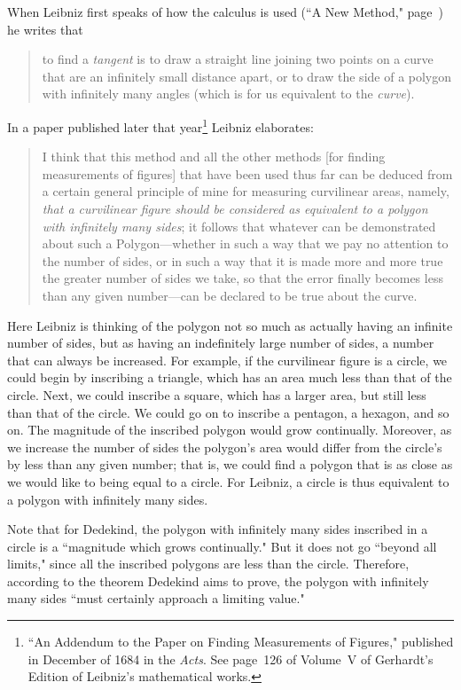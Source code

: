 \documentclass[polutonikogreek,english,twoside,openright]{article}
\begin{document}
When Leibniz first speaks of how the calculus is used (``A New
Method," page\ \pageref{taninfcl}) he writes that
\begin{quote}
  to find a {\em tangent} is to draw a straight line joining two
  points on a curve that are an infinitely small distance apart, or to
  draw the side of a polygon with infinitely many angles (which is for
  us equivalent to the {\em curve}).
\end{quote}
In a paper published later that year\footnote{``An Addendum to the
  Paper on Finding Measurements of Figures," published in December of
  1684 in the {\em Acts}.  See page~126 of Volume~V of Gerhardt's
  Edition of Leibniz's mathematical works.} Leibniz elaborates:
\begin{quote}
  I think that this method and all the other methods [for finding
  measurements of figures] that have been used thus far can be deduced
  from a certain general principle of mine for measuring curvilinear
  areas, namely, {\em that a curvilinear figure should be considered
    as equivalent to a polygon with infinitely many sides}; it follows
  that whatever can be demonstrated about such a Polygon---whether
  in such a way that we pay no attention to the number of sides, or in
  such a way that it is made more and more true the greater number of
  sides we take, so that the error finally becomes less than any given
  number---can be declared to be true about the curve.
\end{quote}
Here Leibniz is thinking of the polygon not so much as actually having
an infinite number of sides, but as having an indefinitely large
number of sides, a number that can always be increased.  For example,
if the curvilinear figure is a circle, we could begin by inscribing a
triangle, which has an area much less than that of the circle.  Next,
we could inscribe a square, which has a larger area, but still less
than that of the circle.  We could go on to inscribe a pentagon, a
hexagon, and so on.  The magnitude of the inscribed polygon would grow
continually.  Moreover, as we increase the number of sides the
polygon's area would differ from the circle's by less than any given
number; that is, we could find a polygon that is as close as we would
like to being equal to a circle.  For Leibniz, a circle is thus
equivalent to a polygon with infinitely many sides.

Note that for Dedekind, the polygon with infinitely many sides
inscribed in a circle is a ``magnitude which grows continually."  But
it does not go ``beyond all limits," since all the inscribed polygons
are less than the circle.  Therefore, according to the theorem
Dedekind aims to prove, the polygon with infinitely many sides ``must
certainly approach a limiting value."
\end{document}
